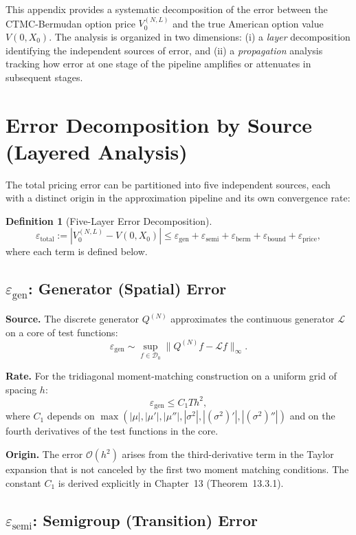 \documentclass[11pt,a4paper,openany]{book}
\theoremstyle{definition}
\newtheorem{definition}{Definition}[chapter]
\theoremstyle{plain}
\theoremstyle{remark}
\newcommand{\1}{\mathbbm{1}}
\begin{document}
This appendix provides a systematic decomposition of the error between the CTMC-Bermudan option price $V_{0}^{(N,L)}$ and the true American option value $V(0,X_{0})$. The analysis is organized in two dimensions: (i) a \emph{layer} decomposition identifying the independent sources of error, and (ii) a \emph{propagation} analysis tracking how error at one stage of the pipeline amplifies or attenuates in subsequent stages.

\section{Error Decomposition by Source (Layered Analysis)}

The total pricing error can be partitioned into five independent sources, each with a distinct origin in the approximation pipeline and its own convergence rate:

\begin{definition}[Five-Layer Error Decomposition]
\[
\boxed{\varepsilon_{\text{total}} := |V_{0}^{(N,L)} - V(0,X_{0})| \leq \varepsilon_{\text{gen}} + \varepsilon_{\text{semi}} + \varepsilon_{\text{berm}} + \varepsilon_{\text{bound}} + \varepsilon_{\text{price}}},
\]
where each term is defined below.
\end{definition}

\subsection{$\varepsilon_{\text{gen}}$: Generator (Spatial) Error}

\textbf{Source.} The discrete generator $Q^{(N)}$ approximates the continuous generator $\mathcal{L}$ on a core of test functions:
\[
\varepsilon_{\text{gen}} \sim \sup_{f \in \mathcal{D}_{0}} \|Q^{(N)} f - \mathcal{L} f\|_{\infty}.
\]

\textbf{Rate.} For the tridiagonal moment-matching construction on a uniform grid of spacing $h$:
\[
\varepsilon_{\text{gen}} \leq C_{1} T h^{2},
\]
where $C_{1}$ depends on $\max(|\mu|, |\mu'|, |\mu''|, |\sigma^{2}|, |(\sigma^{2})'|, |(\sigma^{2})''|)$ and on the fourth derivatives of the test functions in the core.

\textbf{Origin.} The error $\mathcal{O}(h^{2})$ arises from the third-derivative term in the Taylor expansion that is not canceled by the first two moment matching conditions. The constant $C_{1}$ is derived explicitly in Chapter~13 (Theorem~13.3.1).

\subsection{$\varepsilon_{\text{semi}}$: Semigroup (Transition) Error}
\end{document}
